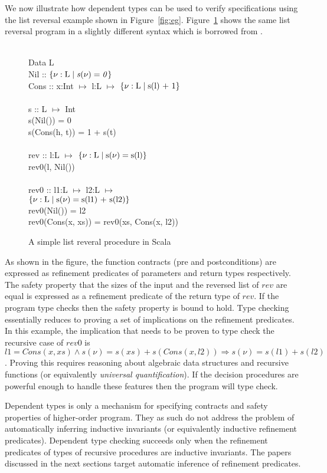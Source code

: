 We now illustrate how dependent types can be used to verify specifications using 
the list reversal example shown in Figure~\ref{fig:eg}.
Figure~\ref{fig:deptypes-eg} shows the same list reversal program 
in a slightly different syntax which is borrowed from \cite{rjhala:ESOP13}.
%
\begin{figure}
\begin{myprogram}
\\
\pnl Data L \\
\pnl \>   Nil :: $\mathit{\{ \nu:\text{L} \; | \; s(\nu) = 0\}}$  \\
\pnl \>   Cons :: x:Int $\mapsto$ l:L $\mapsto$ 
				$\mathit{\{ \nu:\text{L} \; | \; \text{s(l) + 1}\}}$ \\
\\
\pnl s :: L $\mapsto$ Int \\
\pnl \>    s(Nil()) = 0 \\
\pnl \>    s(Cons(h, t)) = 1 + s(t) \\
\\
\pnl rev :: l:L $\mapsto$ $\mathit{\{ \nu:\text{L} \; | \; \text{s}(\nu) = \text{s(l)}\}}$ \\
\pnl \> rev0(l, Nil())  \\
\\    
\pnl rev0 :: l1:L $\mapsto$ l2:L $\mapsto$  \\
\> \> \> \> \> $\mathit{\{ \nu:\text{L} \; | \; \text{s}(\nu) = \text{s(l1) + s(l2)}\}}$  \\
\pnl \> rev0(Nil()) = l2 \\
\pnl \> rev0(Cons(x, xs)) = rev0(xs, Cons(x, l2))
\end{myprogram}
\caption{A simple list reveral procedure in Scala} \label{fig:deptypes-eg}
\end{figure}
%
As shown in the figure, the function contracts (pre and postconditions) are expressed as refinement predicates of parameters and return types respectively. 
The safety property that the sizes of the input and the reversed list of $rev$ are equal is expressed as a refinement predicate of the return type of $rev$. If the 
program type checks then the safety property is bound to hold.
Type checking essentially reduces to proving a set of implications on the refinement predicates. In this example, the implication that needs to be proven to type check the recursive case of $rev0$ is $l1 = Cons(x,xs) \wedge s(\nu) = s(xs) + s(Cons(x,l2)) \Rightarrow s(\nu) = s(l1) + s(l2)$.
Proving this requires reasoning about algebraic data structures and recursive functions (or equivalently \emph{universal quantification}). If the decision
procedures are powerful enough to handle these features then the program will type check.

Dependent types is only a mechanism for specifying contracts and safety properties of higher-order program. They as such do not address the problem of automatically inferring inductive invariants (or equivalently inductive refinement predicates). Dependent type checking succeeds only when the refinement predicates of types of recursive procedures are inductive invariants. The papers discussed in the next sections target automatic inference of refinement predicates.